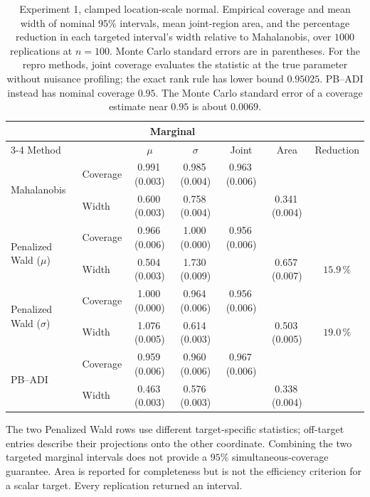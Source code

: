 \begin{table}[!htbp]
\centering
\caption{Experiment 1, clamped location-scale normal. Empirical coverage
and mean width of nominal $95\%$ intervals, mean joint-region area, and
the percentage reduction in each targeted interval's width relative to
Mahalanobis, over $1000$ replications at $n=100$. Monte Carlo standard
errors are in parentheses. For the repro methods, joint coverage
evaluates the statistic at the true parameter without nuisance
profiling; the exact rank rule has lower bound $0.95025$. PB--ADI instead
has nominal coverage $0.95$. The Monte Carlo standard error of a coverage
estimate near $0.95$ is about $0.0069$.}
\label{tab:exp1-main}
\footnotesize
\begingroup
\setlength{\tabcolsep}{5pt}
\begin{tabular}{llccccc}
\toprule
& & \multicolumn{2}{c}{Marginal} & & & \\
\cmidrule(lr){3-4}
Method & & $\mu$ & $\sigma$ & Joint & Area & Reduction \\
\midrule
\multirow{2}{*}{Mahalanobis} & Coverage & 0.991\,(0.003) & 0.985\,(0.004) & 0.963\,(0.006) & & \\
 & Width & 0.600\,(0.003) & 0.758\,(0.004) & & 0.341\,(0.004) &  \\[2pt]
\multirow{2}{*}{Penalized Wald ($\mu$)} & Coverage & 0.966\,(0.006) & 1.000\,(0.000) & 0.956\,(0.006) & & \\
 & Width & 0.504\,(0.003) & 1.730\,(0.009) & & 0.657\,(0.007) & $15.9\,\%$ \\[2pt]
\multirow{2}{*}{Penalized Wald ($\sigma$)} & Coverage & 1.000\,(0.000) & 0.964\,(0.006) & 0.956\,(0.006) & & \\
 & Width & 1.076\,(0.005) & 0.614\,(0.003) & & 0.503\,(0.005) & $19.0\,\%$ \\[2pt]
\multirow{2}{*}{PB--ADI} & Coverage & 0.959\,(0.006) & 0.960\,(0.006) & 0.967\,(0.006) & & \\
 & Width & 0.463\,(0.003) & 0.576\,(0.003) & & 0.338\,(0.004) &  \\
\bottomrule
\end{tabular}
\endgroup

\vspace{2pt}
\begin{minipage}{.94\linewidth}\footnotesize
The two Penalized Wald rows use different target-specific statistics;
off-target entries describe their projections onto the other coordinate.
Combining the two targeted marginal intervals does not provide a
$95\%$ simultaneous-coverage guarantee. Area is reported for completeness
but is not the efficiency criterion for a scalar target. Every replication
returned an interval.
\end{minipage}
\end{table}
